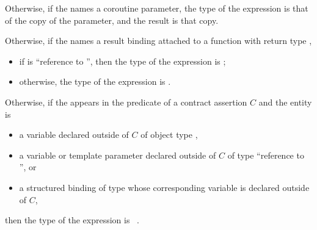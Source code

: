 \pnum
Otherwise,
if the 
names a coroutine parameter,
the type of the expression is
that of the copy of the parameter,
and the result is that copy.

\pnum
Otherwise,
if the 
names a result binding
attached to a function
with return type ,
\begin{itemize}
\item
if  is ``reference to '',
then the type of the expression is
;
\item
otherwise,
the type of the expression is .
\end{itemize}

\pnum
Otherwise,
if the 
appears in the predicate of a contract assertion $C$
and the entity is
\begin{itemize}
\item
a variable
declared outside of $C$
of object type ,
\item
a variable or template parameter
declared outside of $C$
of type ``reference to '', or
\item
a structured binding
of type 
whose corresponding variable
is declared outside of $C$,
\end{itemize}
then the type of the expression is ~.

